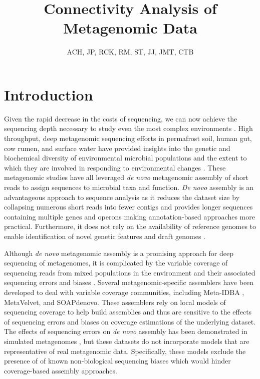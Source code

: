 \documentclass[11pt]{article} %
\begin{document}
\title{Connectivity Analysis of Metagenomic Data}
\author{ACH, JP, RCK, RM, ST, JJ, JMT, CTB}
\maketitle

\section{Introduction}
Given the rapid decrease in the costs of sequencing, we can now achieve the sequencing depth necessary to study even the most complex environments \cite{Hess:2011p686,Qin:2010p189}.  High throughput, deep metagenomic sequencing efforts in permafrost soil, human gut, cow rumen, and surface water have provided insights into the genetic and biochemical diversity of environmental microbial populations \cite{Hess:2011p686,Iverson:2012p1281,Qin:2010p189} and the extent to which they are involved in responding to environmental changes \cite{Mackelprang:2011p1087}. These metagenomic studies have all leveraged \emph{de novo} metagenomic assembly of short reads to assign sequences to microbial taxa and function.  \emph{De novo} assembly is an advantageous approach to sequence analysis as it reduces the dataset size by collapsing numerous short reads into fewer contigs and provides longer sequences containing multiple genes and operons \cite{Miller:2010p226,Pop:2009p798} making annotation-based approaches more practical.  Furthermore, it does not rely on the availability of reference genomes to enable identification of novel genetic features and draft genomes \cite{Hess:2011p686,Iverson:2012p1281}.

Although \emph{de novo} metagenomic assembly is a promising approach for deep sequencing of metagenomes, it is complicated by the variable coverage of sequencing reads from mixed populations in the environment and their associated sequencing errors and biases \cite{Mende:2012p1262,Pignatelli:2011p742}. Several metagenomic-specific assemblers have been developed to deal with variable coverage communities, including Meta-IDBA \cite{Peng:2011p898}, MetaVelvet, and SOAPdenovo.  These assemblers rely on local models of sequencing coverage to help build assemblies and thus are sensitive to the effects of sequencing errors and biases on coverage estimations of the underlying dataset. The effects of sequencing errors on \emph{de novo} assembly has been demonstrated in simulated metagenomes \cite{Mavromatis:2006p894,Mende:2012p1262,Pignatelli:2011p742}, but these datasets do not incorporate models that are representative of real metagenomic data.  Specifically, these models exclude the presence of of known non-biological sequencing biases \cite{GomezAlvarez:2009p1334,Niu:2010p1333} which would hinder coverage-based assembly approaches.  
\end{document}
